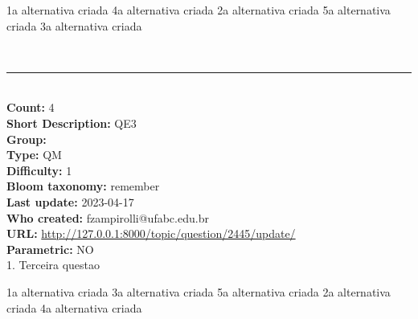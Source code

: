 \documentclass[10pt,brazil,a4paper]{exam}
\begin{document}
\vspace{2mm}\begin{oneparchoices}\hspace{-3mm}
\choice {}1a alternativa criada
\choice {}4a alternativa criada
\choice {}2a alternativa criada
\choice {}5a alternativa criada
\choice {}3a alternativa criada
\end{oneparchoices}\vspace{0mm}\\
\noindent\rule{\textwidth}{0.8pt}\\
\noindent\textbf{Count:} 4\\
\noindent\textbf{Short Description:} QE3\\
\noindent\textbf{Group:} \\
\noindent\textbf{Type:} QM\\
\noindent\textbf{Difficulty:} 1\\
\noindent\textbf{Bloom taxonomy:} remember\\
\noindent\textbf{Last update:} 2023-04-17\\
\noindent\textbf{Who created:} fzampirolli@ufabc.edu.br\\
\noindent\textbf{URL:} \url{http://127.0.0.1:8000/topic/question/2445/update/}\\
\noindent\textbf{Parametric:} NO\\

 \hspace{-1mm} 1. Terceira questao
\n\n

\vspace{2mm}\begin{oneparchoices}\hspace{-3mm}
\choice {}1a alternativa criada
\choice {}3a alternativa criada
\choice {}5a alternativa criada
\choice {}2a alternativa criada
\choice {}4a alternativa criada
\end{oneparchoices}\vspace{0mm}\\
\newpage\\
\end{document}
